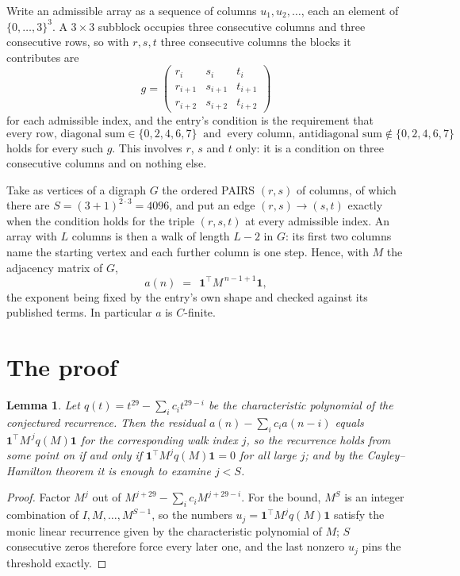 \documentclass[11pt,a4paper]{article}
\theoremstyle{plain}
\newtheorem{lemma}[theorem]{Lemma}
\theoremstyle{definition}
\begin{document}
Write an admissible array as a sequence of columns $u_1,u_2,\dots$, each an element of
$\{0,\dots,3\}^{3}$. A $3\times3$ subblock occupies three consecutive columns and
three consecutive rows, so with $r,s,t$ three consecutive columns the blocks it
contributes are
\[
g=\begin{pmatrix}r_i&s_i&t_i\\ r_{i+1}&s_{i+1}&t_{i+1}\\ r_{i+2}&s_{i+2}&t_{i+2}\end{pmatrix}
\]
for each admissible index, and the entry's condition is the requirement that
\[
\text{every row, diagonal sum} \in \{0,2,4,6,7\}\ \text{ and }\ \text{every column, antidiagonal sum} \notin \{0,2,4,6,7\}
\]
holds for every such $g$. This involves $r$, $s$ and $t$ only: it is a condition on
three consecutive columns and on nothing else.

Take as vertices of a digraph $G$ the ordered PAIRS $(r,s)$ of columns, of which there are
$S=(3+1)^{2\cdot3}=4096$, and put an edge $(r,s)\to(s,t)$ exactly when the condition
holds for the triple $(r,s,t)$ at every admissible index. An array with $L$ columns is then a
walk of length $L-2$ in $G$: its first two columns name the starting vertex and each further
column is one step. Hence, with $M$ the adjacency matrix of $G$,
\[
a(n)\;=\;\,\mathbf{1}^{\!\top}M^{\,n-1+1}\mathbf{1},
\]
the exponent being fixed by the entry's own shape and checked against its published terms.
In particular $a$ is $C$-finite.

\section{The proof}

\begin{lemma}\label{lem:crit}
Let $q(t)=t^{29}-\sum_i c_it^{29-i}$ be the characteristic polynomial of the
conjectured recurrence. Then the residual $a(n)-\sum_ic_ia(n-i)$ equals
$\mathbf{1}^{\!\top}M^{\,j}q(M)\mathbf{1}$ for the corresponding walk index
$j$, so the recurrence holds from some point on if and only if
$\mathbf{1}^{\!\top}M^{j}q(M)\mathbf{1}=0$ for all large $j$; and by the
Cayley--Hamilton theorem it is enough to examine $j<S$.
\end{lemma}

\begin{proof}
Factor $M^{j}$ out of $M^{j+29}-\sum_ic_iM^{j+29-i}$. For the bound, $M^{S}$
is an integer combination of $I,M,\dots,M^{S-1}$, so the numbers
$u_j=\mathbf{1}^{\!\top}M^{j}q(M)\mathbf{1}$ satisfy the monic linear recurrence given by
the characteristic polynomial of $M$; $S$ consecutive zeros therefore force every later one,
and the last nonzero $u_j$ pins the threshold exactly.
\end{proof}
\end{document}

